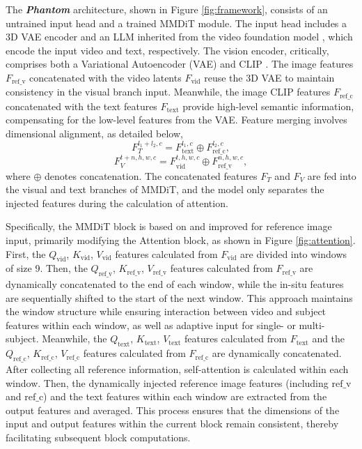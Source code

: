 The \textbf{\textit{Phantom}} architecture, shown in Figure \ref{fig:framework}, consists of an untrained input head and a trained MMDiT module. The input head includes a 3D VAE \cite{yang2024cogvideox}  encoder and an LLM \cite{yang2024qwen2} inherited from the video foundation model \cite{lin2025diffusion, wang2025seedvr}, which encode the input video and text, respectively. 
The vision encoder, critically, comprises both a Variational Autoencoder (VAE) \cite{esser2021taming} and CLIP \cite{zhai2023sigmoid, radford2021learning}. The image features $F_{\text{ref\_v}}$ concatenated with the video latents $F_{\text{vid}}$ reuse the 3D VAE to maintain consistency in the visual branch input. Meanwhile, the image CLIP features $F_{\text{ref\_c}}$ concatenated with the text features $F_{\text{text}}$ provide high-level semantic information, compensating for the low-level features from the VAE. Feature merging involves dimensional alignment, as detailed below, 
\begin{equation}
	F_{T}^{l_1 + l_2, c} =F_{\text{text}}^{l_1,c}\oplus F_{\text{ref\_c}}^{l_2,c},
\end{equation}
\begin{equation}
	F_{V}^{t+n,h,w,c} = F_{\text{vid}}^{t,h,w,c}\oplus F_{\text{ref\_v}}^{n,h,w,c},
	\label{eq:fV}
\end{equation}
where $\oplus$ denotes concatenation. The concatenated features $F_T$ and $F_V$ are fed into the visual and text branches of MMDiT, and the model only separates the injected features during the calculation of attention.

Specifically, the MMDiT block is based on \cite{lin2025diffusion, wang2025seedvr} and improved for reference image input, primarily modifying the Attention \cite{vaswani2017attention} block, as shown in Figure \ref{fig:attention}. 
First, the $Q_{\text{vid}}$, $K_{\text{vid}}$, $V_{\text{vid}}$ features calculated from $F_{\text{vid}}$ are divided into windows of size 9. 
Then, the $Q_{\text{ref\_v}}$, $K_{\text{ref\_v}}$, $V_{\text{ref\_v}}$ features calculated from $F_{\text{ref\_v}}$
are dynamically concatenated to the end of each window, while the in-situ features are sequentially shifted to the start of the next window. 
This approach maintains the window structure while ensuring interaction between video and subject features within each window, as well as adaptive input for single- or multi-subject. 
Meanwhile, the $Q_{\text{text}}$, $K_{\text{text}}$, $V_{\text{text}}$ features calculated from $F_{\text{text}}$ and the $Q_{\text{ref\_c}}$, $K_{\text{ref\_c}}$, $V_{\text{ref\_c}}$ features calculated from $F_{\text{ref\_c}}$ are dynamically concatenated. After collecting all reference information, self-attention is calculated within each window. Then, the dynamically injected reference image features (including $\text{ref\_v}$ and $\text{ref\_c}$) and the text features within each window are extracted from the output features and averaged. This process ensures that the dimensions of the input and output features within the current block remain consistent, thereby facilitating subsequent block computations.


